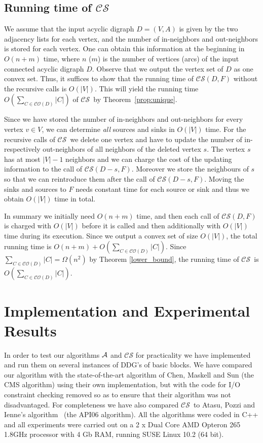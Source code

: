 \documentclass[11pt]{article}
\newcommand{\2}{\vspace{0.2 cm}}
\newcommand\sco{\mathcal{CO}}
\newcommand\cs{{$\mathcal{CS}$}}
\begin{document}
\subsection{Running time of \cs}

We assume that the input acyclic digraph $D=(V,A)$ is given by
the two adjacency lists for each vertex, and the number of in-neighbors and
out-neighbors is stored for each vertex. One can obtain this
information at the beginning in $O(n+m)$ time, where $n$ ($m$) is
the number of vertices (arcs) of the input connected acyclic digraph $D$. Observe
that we output the vertex set of $D$ as one convex set. Thus, it
suffices to show that the running time of {\cs}$(D,F)$ without the
recursive calls is $O(|V|)$. This will yield the running time
$O(\sum_{C\in \sco(D)}|C|)$ of {\cs}\ by
Theorem~\ref{prop:unique}.

Since we have stored the number of in-neighbors and out-neighbors
for every vertex $v\in V$, we can determine \emph{all} sources and
sinks in $O(|V|)$ time. For the recursive calls of {\cs}\ we delete
one vertex and have to update the number of in- respectively
out-neighbors of all neighbors of the deleted vertex $s$. The vertex
$s$ has at most $|V|-1$ neighbors and we can charge the cost of the
updating information to the call of {\cs}$(D-s,F)$. Moreover we store the neighbours
of $s$ so that we can reintroduce them after the call of  {\cs}$(D-s,F)$. Moving the
sinks
and sources to $F$ needs constant time for each source or sink and
thus we obtain $O(|V|)$ time in total.

In summary we initially need $O(n+m)$ time, and then each call of
{\cs}$(D,F)$ is charged with $O(|V|)$ before it is called and then
additionally with $O(|V|)$ time during its execution. Since we
output a convex set of size $O(|V|)$, the total running time is
$O(n+m)+O(\sum_{C\in \sco(D)}|C|)$. Since
 $\sum_{C\in \sco(D)}|C|=\Omega(n^2)$ by Theorem \ref{lower_bound}, the running
time of {\cs}\  is $O(\sum_{C\in \sco(D)}|C|)$.

\section{Implementation and Experimental Results}\label{expersec}


In order to test our algorithms $\cal A$ and {\cs}  for
practicality we have implemented and run them on several instances
of DDG's of basic blocks. We have compared our algorithm with the
state-of-the-art algorithm of Chen, Maskell and Sun \cite{chen}
(the CMS algorithm) using their own implementation, but with the
code for I/O constraint checking removed so as to ensure that their
algorithm was not disadvantaged. For completeness we have also
compared {\cs}\ to Atasu, Pozzi and Ienne's
algorithm~\cite{atasu2006} (the API06 algorithm). All the algorithms
were coded in C++ and all experiments were carried out on a 2 x Dual
Core AMD Opteron 265 1.8GHz processor with 4 Gb RAM, running SUSE
Linux 10.2 (64 bit).
\end{document}
